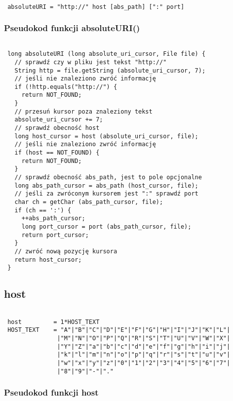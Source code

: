 \documentclass[a4paper,11pt]{report}
\begin{document}
\begin{lstlisting}

 absoluteURI = "http://" host [abs_path] [":" port]

\end{lstlisting}

\subsubsection{Pseudokod funkcji absoluteURI()}

\begin{lstlisting}

 long absoluteURI (long absolute_uri_cursor, File file) {
   // sprawdź czy w pliku jest tekst "http://"
   String http = file.getString (absolute_uri_cursor, 7);
   // jeśli nie znaleziono zwróć informację
   if (!http.equals("http://") {
     return NOT_FOUND;
   }
   // przesuń kursor poza znaleziony tekst
   absolute_uri_cursor += 7;
   // sprawdź obecność host
   long host_cursor = host (absolute_uri_cursor, file);
   // jeśli nie znaleziono zwróć informację
   if (host == NOT_FOUND) {
     return NOT_FOUND;
   }   
   // sprawdź obecność abs_path, jest to pole opcjonalne
   long abs_path_cursor = abs_path (host_cursor, file);
   // jeśli za zwróconym kursorem jest ":" sprawdź port
   char ch = getChar (abs_path_cursor, file);
   if (ch == ':') {
     ++abs_path_cursor;
     long port_cursor = port (abs_path_cursor, file);
     return port_cursor;
   }
   // zwróć nową pozycję kursora
   return host_cursor;   
 }

\end{lstlisting}

\subsection{host}

\begin{lstlisting}

 host         = 1*HOST_TEXT
 HOST_TEXT    = "A"|"B"|"C"|"D"|"E"|"F"|"G"|"H"|"I"|"J"|"K"|"L"|
               |"M"|"N"|"O"|"P"|"Q"|"R"|"S"|"T"|"U"|"V"|"W"|"X"|
               |"Y"|"Z"|"a"|"b"|"c"|"d"|"e"|"f"|"g"|"h"|"i"|"j"|
               |"k"|"l"|"m"|"n"|"o"|"p"|"q"|"r"|"s"|"t"|"u"|"v"|
               |"w"|"x"|"y"|"z"|"0"|"1"|"2"|"3"|"4"|"5"|"6"|"7"|
               |"8"|"9"|"-"|"."

\end{lstlisting}

\subsubsection{Pseudokod funkcji host}
\end{document}
